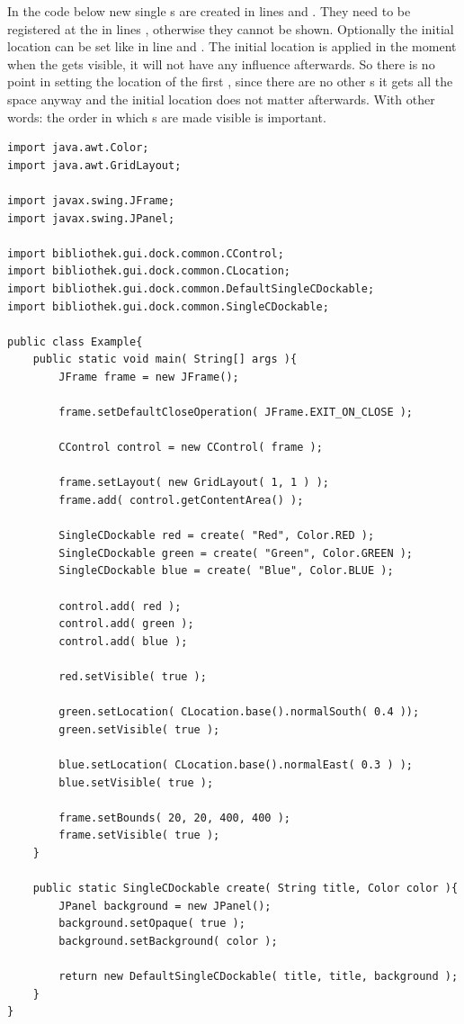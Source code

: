 In the code below new single s are created in lines  and . They need to be registered at the  in lines , otherwise they cannot be shown. Optionally the initial location can be set like in line  and . The initial location is applied in the moment when the  gets visible, it will not have any influence afterwards. So there is no point in setting the location of the first , since there are no other s it gets all the space anyway and the initial location does not matter afterwards. With other words: the order in which s are made visible is important.


\begin{lstlisting}
import java.awt.Color;
import java.awt.GridLayout;

import javax.swing.JFrame;
import javax.swing.JPanel;

import bibliothek.gui.dock.common.CControl;
import bibliothek.gui.dock.common.CLocation;
import bibliothek.gui.dock.common.DefaultSingleCDockable;
import bibliothek.gui.dock.common.SingleCDockable;

public class Example{
	public static void main( String[] args ){
		JFrame frame = new JFrame();
		
		frame.setDefaultCloseOperation( JFrame.EXIT_ON_CLOSE );
		
		CControl control = new CControl( frame );
		
		frame.setLayout( new GridLayout( 1, 1 ) );
		frame.add( control.getContentArea() );
		
		SingleCDockable red = create( "Red", Color.RED );
		SingleCDockable green = create( "Green", Color.GREEN );
		SingleCDockable blue = create( "Blue", Color.BLUE );
		
		control.add( red );
		control.add( green );
		control.add( blue );
		
		red.setVisible( true );
		
		green.setLocation( CLocation.base().normalSouth( 0.4 ));
		green.setVisible( true );
		
		blue.setLocation( CLocation.base().normalEast( 0.3 ) );
		blue.setVisible( true );
		
		frame.setBounds( 20, 20, 400, 400 );
		frame.setVisible( true );
	}
	
	public static SingleCDockable create( String title, Color color ){
		JPanel background = new JPanel();
		background.setOpaque( true );
		background.setBackground( color );
		
		return new DefaultSingleCDockable( title, title, background );
	}
}

\end{lstlisting} 
